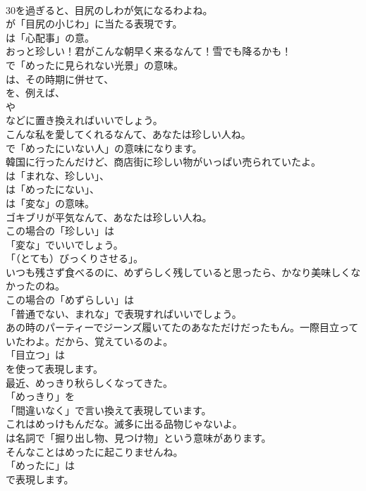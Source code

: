 \documentclass[8pt]{extreport}
\begin{document}
\begin{CJK}{UTF8}{min}
\\	30を過ぎると、目尻のしわが気になるわよね。 
\\	が「目尻の小じわ」に当たる表現です。
\\	は「心配事」の意。	
\\	おっと珍しい！君がこんな朝早く来るなんて！雪でも降るかも！ 
\\	で「めったに見られない光景」の意味。
\\	は、その時期に併せて、
\\	を、例えば、
\\	や
\\	などに置き換えればいいでしょう。	
\\	こんな私を愛してくれるなんて、あなたは珍しい人ね。 
\\	で「めったにいない人」の意味になります。	
\\	韓国に行ったんだけど、商店街に珍しい物がいっぱい売られていたよ。 
\\	は「まれな、珍しい」、
\\	は「めったにない」、
\\	は「変な」の意味。	
\\	ゴキブリが平気なんて、あなたは珍しい人ね。 
\\	この場合の「珍しい」は
\\	「変な」でいいでしょう。
\\	「（とても）びっくりさせる」。	
\\	いつも残さず食べるのに、めずらしく残していると思ったら、かなり美味しくなかったのね。 
\\	この場合の「めずらしい」は
\\	「普通でない、まれな」で表現すればいいでしょう。	
\\	あの時のパーティーでジーンズ履いてたのあなただけだったもん。一際目立っていたわよ。だから、覚えているのよ。 
\\	「目立つ」は
\\	を使って表現します。	
\\	最近、めっきり秋らしくなってきた。 
\\	「めっきり」を
\\	「間違いなく」で言い換えて表現しています。	
\\	これはめっけもんだな。滅多に出る品物じゃないよ。 
\\	は名詞で「掘り出し物、見つけ物」という意味があります。	
\\	そんなことはめったに起こりませんね。 
\\	「めったに」は
\\	で表現します。	

\end{CJK}
\end{document}
